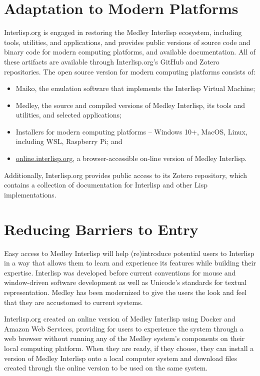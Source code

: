 \documentclass[sigconf]{acmart}
\begin{document}
\section{Adaptation to Modern Platforms}

Interlisp.org is engaged in restoring the Medley Interlisp ecosystem, including tools, utilities, and applications, and provides public versions of source code and binary code for modern computing platforms, and available documentation. All of these artifacts are available through Interlisp.org's GitHub and Zotero repositories. The open source version for modern computing platforms consists of:

\begin{itemize}
  \item Maiko, the emulation software that implements the Interlisp Virtual Machine;

  \item Medley, the source and compiled versions of Medley Interlisp, its tools and utilities, and selected applications; 

  \item Installers for modern computing platforms – Windows 10+, MacOS, Linux, including WSL, Raspberry Pi; and

  \item \url{online.interlisp.org}, a browser-accessible on-line version of Medley Interlisp.
\end{itemize}

Additionally, Interlisp.org provides public access to its Zotero repository, which contains a collection of documentation for Interlisp and other Lisp implementations.

\section{Reducing Barriers to Entry}

Easy access to Medley Interlisp will help (re)introduce potential users to Interlisp in a way that allows them to learn and experience its features while building their expertise. Interlisp was developed before current conventions for mouse and window-driven software development as well as Unicode's standards for textual representation. Medley has been modernized to give the users the look and feel that they are accustomed to current systems.

Interlisp.org created an online version of Medley Interlisp using Docker and Amazon Web Services, providing for users to experience the system through a web browser without running any of the Medley system's components on their local computing platform. When they are ready, if they choose, they can install a version of Medley Interlisp onto a local computer system and download files created through the online version to be used on the same system.
\end{document}
